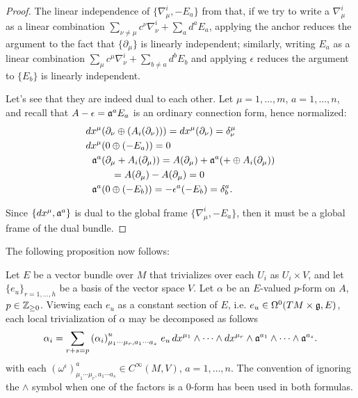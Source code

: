 \begin{proof}
The linear independence of $\{\nabla^i_\mu, -E_a\}$ from that, if we try to write a $\nabla^i_\mu$ as a linear combination $\sum_{\nu \neq \mu} c^\nu \nabla^i_\nu + \sum_a d^a E_a$, applying the anchor reduces the argument to the fact that $\{\partial_\mu\}$ is linearly independent; similarly, writing $E_a$ as a linear combination $\sum_{\mu} c^\mu \nabla^i_\nu + \sum_{b \neq a} d^b E_b$ and applying $\epsilon$ reduces the argument to $\{E_b\}$ is linearly independent.

Let's see that they are indeed dual to each other. Let $\mu = 1, \dots, m$, $a = 1, \dots, n$, and recall that $A - \epsilon = \alg a^a E_a$ is an ordinary connection form, hence normalized:
\begin{align*}
    dx^\mu&(\partial_\nu \oplus( A_i(\partial_\nu))) = dx^\mu(\partial_\nu) = \delta^\mu_\nu\\
    dx^\mu&(0 \oplus (-E_a)) = 0\\
    \alg a^a&(\partial_\mu + A_i(\partial_\mu)) = A(\partial_\mu) + \alg a^a(+\oplus A_i(\partial_\mu)) \\
    &\quad = A(\partial_\mu) - A(\partial_\mu) = 0\\
    \alg a^a&(0\oplus (-E_b)) = -\epsilon^a(-E_b) = \delta^a_b.
\end{align*}

Since $\{dx^\mu, \mathfrak{a}^a\}$ is dual to the global frame $\{\nabla^i_\mu, -E_a\}$, then it must be a global frame of the dual bundle.
\end{proof}

The following proposition now follows:
\begin{proposition}\label{TheoremDecompOfVectorValuedFormsTLAMixedLocalBasisDxs}
Let $E$ be a vector bundle over $M$ that trivializes over each $U_i$ as $U_i \times V$, and let $\{e_u\}_{r = 1, \dots, h}$ be a basis of the vector space $V$. Let $\alpha$ be an $E$-valued $p$-form on $A$, $p \in \mathbb{Z}_{\geq 0}$. Viewing each $e_u$ as a constant section of $E$, i.e. $e_u \in \Omega^0(TM \times \mathfrak{g}, E)$, each local trivialization of $\alpha$ may be decomposed as follows
\begin{equation}
    \alpha_i = \sum_{r + s = p} \left(\alpha_i \right)^u_{\mu_1 \cdots \mu_r, a_1 \cdots a_s}\, e_u \, dx^{\mu_1} \wedge \cdots \wedge dx^{\mu_r} \wedge \mathfrak{a}^{a_1} \wedge \cdots \wedge \mathfrak{a}^{a_s}.
\end{equation} 
with each $\left(\omega^\epsilon\right)^a_{\mu_1 \cdots \mu_r, a_1 \cdots a_s} \in C^\infty(M, V)$, $a = 1, \dots, n$.
The convention of ignoring the $\wedge$ symbol when one of the factors is a $0$-form has been used in both formulas.
\end{proposition}

